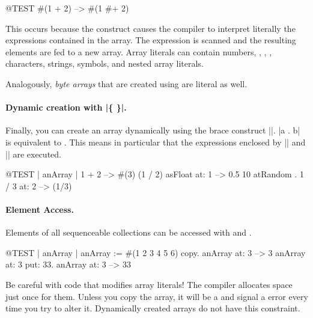\documentclass[a4paper,10pt,twoside]{book}
\begin{document}
\begin{code}{@TEST}
#(1 + 2) -->  #(1 #+ 2)
\end{code}

\noindent
This occurs because the construct \ct{#()} causes the compiler to interpret literally the expressions contained in the array.
The expression is scanned and the resulting elements are fed to a new array.
Array literals can contain numbers, , , , characters, strings, symbols, and nested array literals.

Analogously, \emph{byte arrays} that are created using \ct{#[ ]} are literal as well.

\paragraph{Dynamic creation with \ct|\{ \}|.}
Finally, you can create an array dynamically using the brace construct \ct|{}|.
\ct|{a . b}| is equivalent to .
This means in particular that the expressions enclosed by \ct|{| and \ct|}| are executed.


\begin{code}{@TEST | anArray |}
{1 + 2} --> #(3)
{(1 / 2) asFloat} at: 1 --> 0.5
{10 atRandom . 1 / 3} at: 2 --> (1/3)
\end{code}

\paragraph{Element Access.}
Elements of all sequenceable collections can be accessed with  and .

\begin{code}{@TEST | anArray |}
anArray := #(1 2 3 4 5 6) copy.
anArray at: 3 --> 3
anArray at: 3 put: 33.
anArray at: 3 --> 33
\end{code}

\noindent
Be careful with code that modifies array literals!
The compiler allocates space just once for them.
Unless you copy the array, it will be a  and signal a  error every time you try to alter it.
Dynamically created arrays do not have this constraint.
\end{document}
